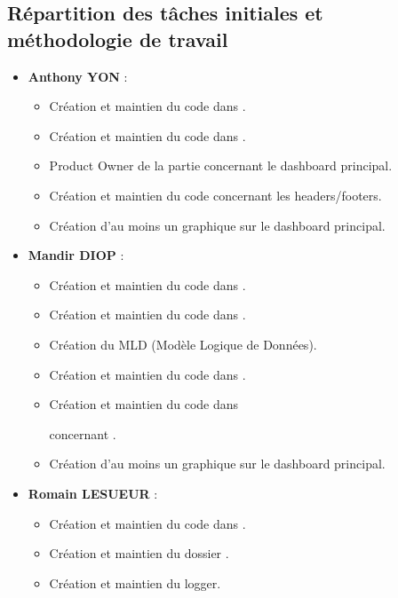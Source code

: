 \documentclass[11pt]{article}
\begin{document}
\subsection*{Répartition des tâches initiales et méthodologie de travail}
\begin{itemize}
  \item \textbf{Anthony YON} :
    \begin{itemize}
      \item Création et maintien du code dans \texttt{}.
      \item Création et maintien du code dans \texttt{}.
      \item Product Owner de la partie \texttt{} concernant le dashboard principal.
      \item Création et maintien du code concernant les headers/footers.
      \item Création d'au moins un graphique sur le dashboard principal.
    \end{itemize}
  \item \textbf{Mandir DIOP} :
    \begin{itemize}
      \item Création et maintien du code dans \texttt{}.
      \item Création et maintien du code dans \texttt{}.
      \item Création du MLD (Modèle Logique de Données).
      \item Création et maintien du code dans \texttt{}.
            \item Création et maintien du code dans \texttt{} \par concernant \texttt{}.
      \item Création d'au moins un graphique sur le dashboard principal.
    \end{itemize}
  \item \textbf{Romain LESUEUR} :
    \begin{itemize}
      \item Création et maintien du code dans \texttt{}.
      \item Création et maintien du dossier \texttt{}.
      \item Création et maintien du logger.

\end{itemize}
\end{itemize}
\end{document}
